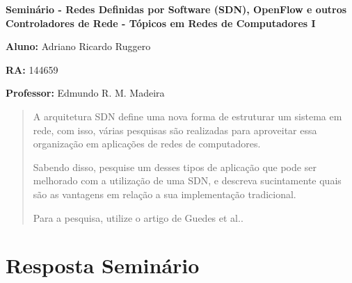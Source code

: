 \documentclass[12pt,twoside,a4paper]{article}
\begin{document}
\vskip 15mm

\begin{center} 
\textbf{Seminário  - Redes Definidas por Software (SDN),
OpenFlow e outros Controladores de Rede - Tópicos em Redes de Computadores I}

\end{center}

\vskip 5mm

\textbf{Aluno:} Adriano Ricardo Ruggero

\textbf{RA:} 144659

\textbf{Professor:} Edmundo R. M. Madeira

\vskip 20mm

\begin{abstract}

A arquitetura SDN define uma nova forma de estruturar um
sistema em rede, com isso, várias pesquisas são realizadas
para aproveitar essa organização em aplicações de redes de
computadores.

Sabendo disso, pesquise um desses tipos de aplicação que
pode ser melhorado com a utilização de uma SDN, e descreva
sucintamente quais são as vantagens em relação a sua
implementação tradicional.

Para a pesquisa, utilize o artigo de Guedes et al.\cite{SDN}.


\end{abstract}

\newpage
\pagestyle{plain}
\headheight 0.0cm
\headsep 0.0cm
\footskip 2.2cm

\section{Resposta Seminário}
\label{sec:01}





\end{document}

